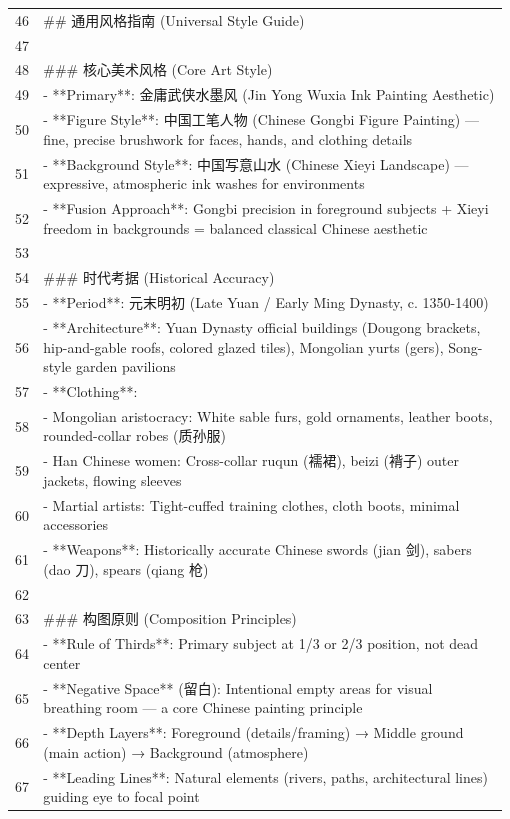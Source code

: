 \begin{longtable}{@{}>{\RaggedLeft\arraybackslash\footnotesize}p{0.04\linewidth}@{\hspace{0.8em}}>{\RaggedRight\arraybackslash\ttfamily\scriptsize}p{0.935\linewidth}@{}}
46 & \#\# \promptemoji{🎨} 通用风格指南 (Universal Style Guide)\\
47 & \mbox{}\\
48 & \#\#\# 核心美术风格 (Core Art Style)\\
49 & - **Primary**: 金庸武侠水墨风 (Jin Yong Wuxia Ink Painting Aesthetic)\\
50 & - **Figure Style**: 中国工笔人物 (Chinese Gongbi Figure Painting) — fine, precise brushwork for faces, hands, and clothing details\\
51 & - **Background Style**: 中国写意山水 (Chinese Xieyi Landscape) — expressive, atmospheric ink washes for environments\\
52 & - **Fusion Approach**: Gongbi precision in foreground subjects + Xieyi freedom in backgrounds = balanced classical Chinese aesthetic\\
53 & \mbox{}\\
54 & \#\#\# 时代考据 (Historical Accuracy)\\
55 & - **Period**: 元末明初 (Late Yuan / Early Ming Dynasty, c. 1350-1400)\\
56 & - **Architecture**: Yuan Dynasty official buildings (Dougong brackets, hip-and-gable roofs, colored glazed tiles), Mongolian yurts (gers), Song-style garden pavilions\\
57 & - **Clothing**:\\
58 &   - Mongolian aristocracy: White sable furs, gold ornaments, leather boots, rounded-collar robes (质孙服)\\
59 &   - Han Chinese women: Cross-collar ruqun (襦裙), beizi (褙子) outer jackets, flowing sleeves\\
60 &   - Martial artists: Tight-cuffed training clothes, cloth boots, minimal accessories\\
61 & - **Weapons**: Historically accurate Chinese swords (jian 剑), sabers (dao 刀), spears (qiang 枪)\\
62 & \mbox{}\\
63 & \#\#\# 构图原则 (Composition Principles)\\
64 & - **Rule of Thirds**: Primary subject at 1/3 or 2/3 position, not dead center\\
65 & - **Negative Space** (留白): Intentional empty areas for visual breathing room — a core Chinese painting principle\\
66 & - **Depth Layers**: Foreground (details/framing) → Middle ground (main action) → Background (atmosphere)\\
67 & - **Leading Lines**: Natural elements (rivers, paths, architectural lines) guiding eye to focal point\\

\end{longtable}
